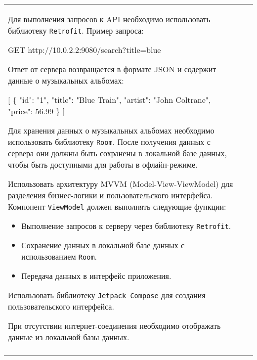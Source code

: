 \documentclass[a4paper]{article}
\begin{document}
\begin{tabular}{!{\vrule width 2pt}p{5cm}|p{6cm}|p{4cm}!{\vrule width 2pt}}
{\begin{minipage}{16cm}
\begin{enumerate}

Для выполнения запросов к API необходимо использовать библиотеку \texttt{Retrofit}. Пример запроса:


GET http://10.0.2.2:9080/search?title=blue


Ответ от сервера возвращается в формате JSON и содержит данные о музыкальных альбомах:


[
  \{
    "id": "1",
    "title": "Blue Train",
    "artist": "John Coltrane",
    "price": 56.99
  \}
]


Для хранения данных о музыкальных альбомах необходимо использовать библиотеку \texttt{Room}. После получения данных с сервера они должны быть сохранены в локальной базе данных, чтобы быть доступными для работы в офлайн-режиме.

Использовать архитектуру MVVM (Model-View-ViewModel) для разделения бизнес-логики и пользовательского интерфейса. Компонент \texttt{ViewModel} должен выполнять следующие функции:
\begin{itemize}
    \item Выполнение запросов к серверу через библиотеку \texttt{Retrofit}.
    \item Сохранение данных в локальной базе данных с использованием \texttt{Room}.
    \item Передача данных в интерфейс приложения.
\end{itemize}

Использовать библиотеку \texttt{Jetpack Compose} для создания пользовательского интерфейса.

При отсутствии интернет-соединения необходимо отображать данные из локальной базы данных. 
\end{enumerate}

\vspace{0.2cm}
    
\end{minipage}
}
\\
\end{tabular}
\end{document}
